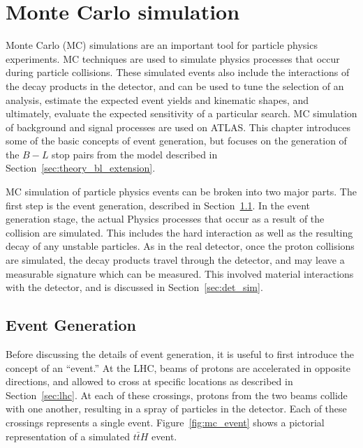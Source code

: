 \chapter[Monte Carlo simulation][Monte Carlo simulation]{Monte Carlo simulation}
\label{ch:mc}

Monte Carlo (MC) simulations are an important tool for particle physics
experiments.
MC techniques are used to simulate physics processes that occur during
particle collisions.
These simulated events also include the interactions of the decay products
in the detector, and can be used to tune the selection of an analysis,
estimate the expected event yields and kinematic shapes, and ultimately,
evaluate the expected sensitivity of a particular search.
MC simulation of background and signal processes are used on ATLAS.
This chapter introduces some of the basic concepts of event generation, but
focuses on the generation of the $B-L$ stop pairs from the model described in
Section~\ref{sec:theory_bl_extension}.

MC simulation of particle physics events can be broken into two major parts.
The first step is the event generation, described in
Section~\ref{sec:event_gen}.
In the event generation stage, the actual Physics processes that occur as a
result of the collision are simulated.
This includes the hard interaction as well as the resulting decay of any
unstable particles.
As in the real detector, once the proton collisions are simulated, the decay
products travel through the detector, and may leave a measurable signature
which can be measured.
This involved material interactions with the detector, and is discussed in
Section~\ref{sec:det_sim}.

\FloatBarrier
\section{Event Generation}
\label{sec:event_gen}

Before discussing the details of event generation, it is useful to first
introduce the concept of an ``event.''
At the LHC, beams of protons are accelerated in opposite directions, and
allowed to cross at specific locations as described in Section~\ref{sec:lhc}.
At each of these crossings, protons from the two beams collide with one
another, resulting in a spray of particles in the detector.
Each of these crossings represents a single event.
Figure~\ref{fig:mc_event} shows a pictorial representation of a simulated
$t\bar{t}H$ event.

